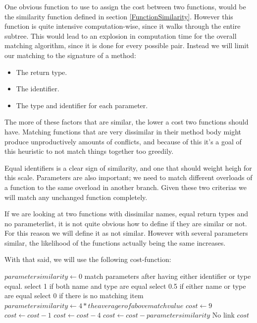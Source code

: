 \documentclass[11pt]{article}
\begin{document}
One obvious function to use to assign the cost between two functions, would be the similarity function defined in section \ref{FunctionSimilarity}. However this function is quite intensive computation-wise, since it walks through the entire subtree. This would lead to an explosion in computation time for the overall matching algorithm, since it is done for every possible pair. Instead we will limit our matching to the signature of a method:

\begin{itemize}
    \item The return type.
    \item The identifier.
    \item The type and identifier for each parameter.
\end{itemize}

The more of these factors that are similar, the lower a cost two functions should have. Matching functions that are very dissimilar in their method body might produce unproductively amounts of conflicts, and because of this it's a goal of this heuristic to not match things together too greedily.

Equal identifiers is a clear sign of similarity, and one that should weight heigh for this scale. Parameters are also important; we need to match different overloads of a function to the same overload in another branch. Given these two criterias we will match any unchanged function completely.

If we are looking at two functions with dissimilar names, equal return types and no parameterlist, it is not quite obvious how to define if they are similar or not. For this reason we will define it as not similar. However with several parameters similar, the likelihood of the functions actually being the same increases. 

With that said, we will use the following cost-function:
\begin{algorithmic}
   \State $parametersimilarity \gets 0$
      \State match parameters after having either identifier or type equal.
	      \State select 1 if both name and type are equal
    	  \State select 0.5 if either name or type are equal
	      \State select 0 if there is no matching item
      \EndFor
      \State $parametersimilarity \gets 4*the averager of above match value$
   \EndIf
   \State $cost \gets 9$
      \State $cost \gets cost - 1$
   \EndIf
      \State $cost \gets cost - 4$
   \EndIf
   \State $cost \gets cost - parametersimilarity$
         \State \Return No link
   \EndIf
   \State \Return $cost$
\EndFunction
\end{algorithmic}
\end{document}
